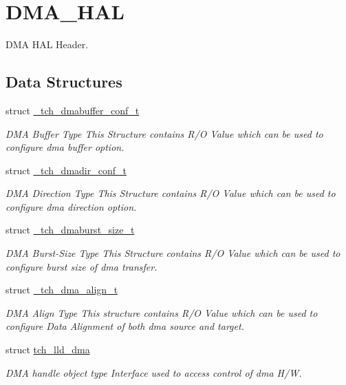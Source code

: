 \hypertarget{group___d_m_a___h_a_l}{\section{D\+M\+A\+\_\+\+H\+A\+L}
\label{group___d_m_a___h_a_l}
}


D\+M\+A H\+A\+L Header.  


\subsection*{Data Structures}
\begin{DoxyCompactItemize}
\item 
struct \hyperlink{struct__tch__dmabuffer__conf__t}{\+\_\+tch\+\_\+dmabuffer\+\_\+conf\+\_\+t}
\begin{DoxyCompactList}\small\item\em D\+M\+A Buffer Type This Structure contains R/\+O Value which can be used to configure dma buffer option. \end{DoxyCompactList}\item 
struct \hyperlink{struct__tch__dmadir__conf__t}{\+\_\+tch\+\_\+dmadir\+\_\+conf\+\_\+t}
\begin{DoxyCompactList}\small\item\em D\+M\+A Direction Type This Structure contains R/\+O Value which can be used to configure dma direction option. \end{DoxyCompactList}\item 
struct \hyperlink{struct__tch__dmaburst__size__t}{\+\_\+tch\+\_\+dmaburst\+\_\+size\+\_\+t}
\begin{DoxyCompactList}\small\item\em D\+M\+A Burst-\/\+Size Type This Structure contains R/\+O Value which can be used to configure burst size of dma transfer. \end{DoxyCompactList}\item 
struct \hyperlink{struct__tch__dma__align__t}{\+\_\+tch\+\_\+dma\+\_\+align\+\_\+t}
\begin{DoxyCompactList}\small\item\em D\+M\+A Align Type This structure contains R/\+O Value which can be used to configure Data Alignment of both dma source and target. \end{DoxyCompactList}\item 
struct \hyperlink{structtch__lld__dma}{tch\+\_\+lld\+\_\+dma}
\begin{DoxyCompactList}\small\item\em D\+M\+A handle object type Interface used to access control of dma H/\+W. \end{DoxyCompactList}\end{DoxyCompactItemize}
